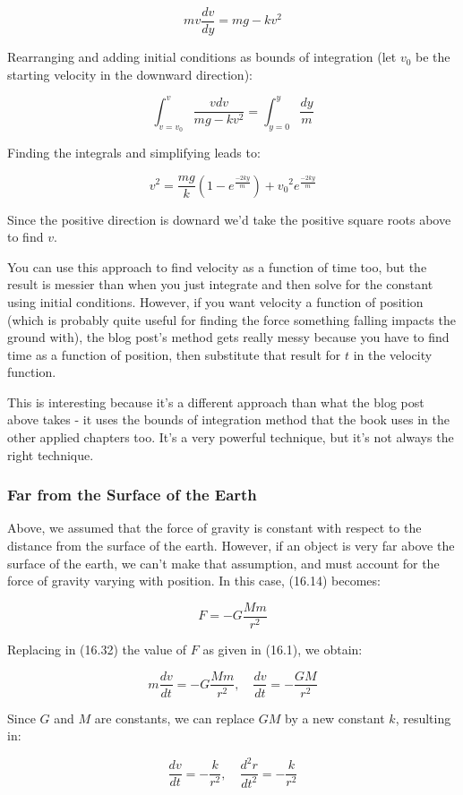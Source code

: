 \documentclass{article}
\begin{document}
\[ mv\frac{dv}{dy} = mg - kv^2 \]

Rearranging and adding initial conditions as bounds of integration (let $v_0$ be the starting velocity in the downward direction):

\[ \int_{v=v_0}^{v}\frac{vdv}{mg-kv^2} = \int_{y=0}^{y}\frac{dy}{m} \]

Finding the integrals and simplifying leads to:

\[ v^2 = \frac{mg}{k}(1-e^{\frac{-2ky}{m}})+{v_0}^2e^{\frac{-2ky}{m}} \]

Since the positive direction is downard we'd take the positive square roots above to find $v$.

You can use this approach to find velocity as a function of time too, but the result is messier than when you just integrate and then solve for the constant using initial conditions. However, if you want velocity a function of position (which is probably quite useful for finding the force something falling impacts the ground with), the blog post's method gets really messy because you have to find time as a function of position, then substitute that result for $t$ in the velocity function.

This is interesting because it's a different approach than what the blog post above takes - it uses the bounds of integration method that the book uses in the other applied chapters too. It's a very powerful technique, but it's not always the right technique.

\subsubsection{Far from the Surface of the Earth}

Above, we assumed that the force of gravity is constant with respect to the distance from the surface of the earth. However, if an object is very far above the surface of the earth, we can't make that assumption, and must account for the force of gravity varying with position. In this case, (16.14) becomes:

\[ \tag{16.32} F = -G\frac{Mm}{r^2} \]

Replacing in (16.32) the value of $F$ as given in (16.1), we obtain:

\[ \tag{16.34} m\frac{dv}{dt} = -G\frac{Mm}{r^2},\quad \frac{dv}{dt} = -\frac{GM}{r^2} \]

Since $G$ and $M$ are constants, we can replace $GM$ by a new constant $k$, resulting in:

\[ \tag{16.35} \frac{dv}{dt} = -\frac{k}{r^2},\quad \frac{d^2r}{dt^2} = - \frac{k}{r^2} \]
\end{document}

